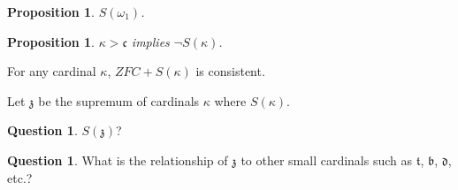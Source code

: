 \documentclass{beamer}
\newtheorem{proposition}[theorem]{Proposition}
\theoremstyle{example}
\theoremstyle{definition}
\newtheorem{question}[theorem]{Question}
\newcommand{\<}{\langle}
\renewcommand{\>}{\rangle}
\newcommand{\alcompS}[1]{S(#1)}
\begin{document}
\begin{frame}
  \begin{proposition}
    \(\alcompS{\omega_1}\).
  \end{proposition}

  \pause

  \begin{proposition}
    \(\kappa>\mathfrak c\) implies \(\neg\alcompS\kappa\).
  \end{proposition}

  \pause

  \begin{theorem}
    For any cardinal \(\kappa\), \(ZFC+\alcompS\kappa\)
    is consistent.
  \end{theorem}

\end{frame}

\begin{frame}

  Let \(\mathfrak z\) be the supremum of cardinals \(\kappa\) where
  \(\alcompS{\kappa}\).

  \pause

  \begin{question}
    \(S(\mathfrak z)\)?
  \end{question}

  \pause

  \begin{question}
    What is the relationship of \(\mathfrak z\)
    to other small cardinals such as
    \(\mathfrak t\), \(\mathfrak b\), \(\mathfrak d\), etc.?
  \end{question}

\end{frame}
\end{document}

